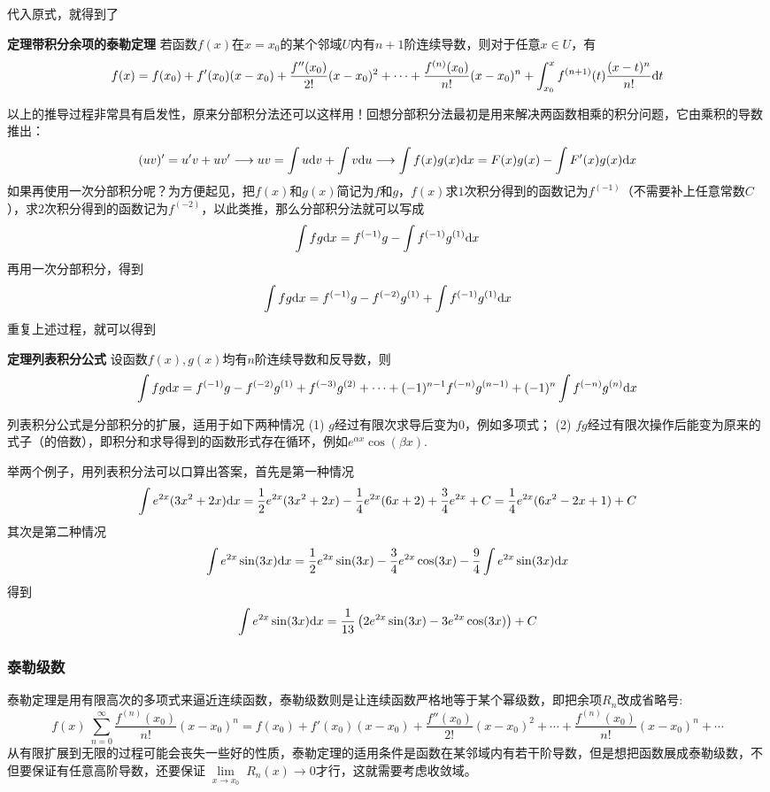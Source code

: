 \documentclass[UTF8]{ctexart}
\newcommand{\trm}[1]{{\rm #1}}
\newenvironment{theorem}[1]
    {\begin{tcolorbox}[enhanced, colback=LightYellow, breakable=true, frame hidden, borderline west={1.5mm}{-2mm}{DarkBlue}]
    {\bfseries {\color{DarkBlue} 定理}\quad #1} \newline}
    {\end{tcolorbox}}
\begin{document}
代入原式，就得到了
\begin{theorem}{带积分余项的泰勒定理}
    若函数\(f(x)\)在\(x=x_0\)的某个邻域\(U\)内有\(n+1\)阶连续导数，则对于任意\(x\in U\)，有
    \[f(x)=f(x_0)+f'(x_0)(x-x_0)+\frac{f''(x_0)}{2!}(x-x_0)^2+\cdots+\frac{f^{(n)}(x_0)}{n!}(x-x_0)^n+\int_{x_0}^{x}f^{(n+1)}(t)\frac{(x-t)^{n}}{n!}\trm{d}t\]
\end{theorem}

以上的推导过程非常具有启发性，原来分部积分法还可以这样用！回想分部积分法最初是用来解决两函数相乘的积分问题，它由乘积的导数推出：
\[(uv)'=u'v+uv' \longrightarrow uv = \int u\trm{d}v+\int v\trm{d}u  \longrightarrow \int f(x)g(x)\trm{d}x = F(x)g(x)-\int F'(x)g(x)\trm{d}x\]
如果再使用一次分部积分呢？为方便起见，把\(f(x)\)和\(g(x)\)简记为\(f\)和\(g\)，\(f(x)\)求\(1\)次积分得到的函数记为\(f^{(-1)}\)（不需要补上任意常数\(C\)），求\(2\)次积分得到的函数记为\(f^{(-2)}\)，以此类推，那么分部积分法就可以写成
\[\int fg\trm{d}x=f^{(-1)}g-\int f^{(-1)}g^{(1)} \trm{d}x\]
再用一次分部积分，得到
\[\int fg\trm{d}x=f^{(-1)}g-f^{(-2)}g^{(1)}+\int f^{(-1)}g^{(1)} \trm{d}x\]
重复上述过程，就可以得到
\begin{theorem}{列表积分公式}
    设函数\(f(x),g(x)\)均有\(n\)阶连续导数和反导数，则
    \[\int fg\trm{d}x=f^{(-1)}g-f^{(-2)}g^{(1)}+f^{(-3)}g^{(2)}+\cdots+(-1)^{n-1}f^{(-n)}g^{(n-1)}+(-1)^n\int f^{(-n)}g^{(n)} \trm{d}x\]
\end{theorem}

列表积分公式是分部积分的扩展，适用于如下两种情况
\newline
(1) \(g\)经过有限次求导后变为\(0\)，例如多项式；\newline
(2) \(fg\)经过有限次操作后能变为原来的式子（的倍数），即积分和求导得到的函数形式存在循环，例如\(e^{\alpha x}\cos(\beta x)\).

举两个例子，用列表积分法可以口算出答案，首先是第一种情况
\[\int e^{2x}(3x^2+2x)\trm{d}x = \frac{1}{2}e^{2x}(3x^2+2x)-\frac{1}{4}e^{2x}(6x+2)+\frac{3}{4}e^{2x}+C=\frac{1}{4}e^{2x}(6x^2-2x+1)+C\]
其次是第二种情况
\[\int e^{2x}\sin(3x)\trm{d}x = \frac{1}{2}e^{2x}\sin(3x)-\frac{3}{4}e^{2x}\cos(3x)-\frac{9}{4}\int e^{2x}\sin(3x)\trm{d}x\]
得到
\[\int e^{2x}\sin(3x)\trm{d}x = \frac{1}{13}\left(2e^{2x}\sin(3x)-3e^{2x}\cos(3x)\right)+C\]

\subsubsection{泰勒级数}

泰勒定理是用有限高次的多项式来逼近连续函数，泰勒级数则是让连续函数严格地等于某个幂级数，即把余项\(R_n\)改成省略号:
\[f(x) ~ \sum_{n=0}^{\infty} \frac{f^{(n)}(x_0)}{n!}(x-x_0)^n = f(x_0)+f'(x_0)(x-x_0)+\frac{f''(x_0)}{2!}(x-x_0)^2+\cdots+\frac{f^{(n)}(x_0)}{n!}(x-x_0)^n+\cdots\]
从有限扩展到无限的过程可能会丧失一些好的性质，泰勒定理的适用条件是函数在某邻域内有若干阶导数，但是想把函数展成泰勒级数，不但要保证有任意高阶导数，还要保证\(\lim \limits_{\substack{x \to x_0}}R_n(x) \to 0\)才行，这就需要考虑收敛域。
\end{document}
